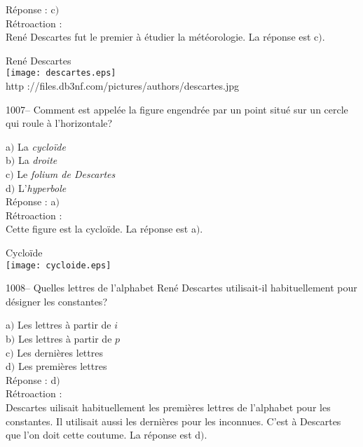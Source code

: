﻿\documentclass[letterpaper, 12pt]{article}
\begin{document}
R\'eponse : c$)$\\

R\'etroaction : \\
Ren\'e Descartes fut le premier \`a \'etudier la m\'et\'eorologie.
La r\'eponse est c$)$.\\

        \begin{center}
        Ren\'e Descartes\\
    \texttt{[image: descartes.eps]}\\
        {\footnotesize http
://files.db3nf.com/pictures/authors/descartes.jpg}
    \end{center}

1007-- Comment est appel\'ee la figure engendr\'ee par un point situ\'e sur
un cercle qui roule \`a l'horizontale?

a$)$ La {\sl cyclo\"ide} \\
b$)$ La {\sl droite} \\
c$)$ Le {\sl folium de Descartes} \\
d$)$ L'{\sl hyperbole}\\

R\'eponse : a$)$\\

R\'etroaction : \\
Cette figure est la cyclo\"ide.
La r\'eponse est a$)$.\\

        \begin{center}
       Cyclo\"ide \\
    \texttt{[image: cycloide.eps]}\\
    \end{center}

1008-- Quelles lettres de l'alphabet Ren\'e Descartes utilisait-il
habituellement pour d\'esigner les constantes?

a$)$ Les lettres \`a partir de $i$ \\
b$)$ Les lettres \`a partir de $p$ \\
c$)$ Les derni\`eres lettres \\
d$)$ Les premi\`eres lettres\\

R\'eponse : d$)$\\

R\'etroaction : \\
Descartes uilisait habituellement les premi\`eres lettres de
l'alphabet pour les constantes. Il utilisait aussi les derni\`eres
pour les inconnues. C'est \`a Descartes que l'on doit cette coutume.
La r\'eponse est d$)$.\\
\end{document}
